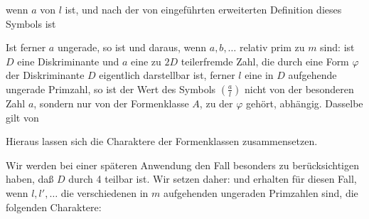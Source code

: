 wenn $a$  von $l$ ist, und nach der von
 eingeführten erweiterten Definition dieses Symbols ist

Ist ferner $a$ ungerade, so ist
und daraus, wenn $a, b, \dots$ relativ prim zu $m$ sind:
ist $D$ eine Diskriminante und $a$ eine zu $2D$ teilerfremde Zahl,
die durch eine Form $\varphi$ der Diskriminante $D$ eigentlich darstellbar
 ist, ferner $l$ eine in $D$ aufgehende ungerade Primzahl,
so ist der Wert des Symbols $\left(\frac{a}{l}\right)$ nicht von der besonderen
Zahl $a$, sondern nur von der Formenklasse $A$, zu der $\varphi$ gehört,
abhängig. Dasselbe gilt von

Hieraus lassen sich die Charaktere der Formenklassen
zusammensetzen.

Wir werden bei einer späteren Anwendung den Fall besonders
 zu berücksichtigen haben, daß $D$ durch 4 teilbar ist.
Wir setzen daher:
und erhalten für diesen Fall, wenn $l, l', \dots$ die verschiedenen
in $m$ aufgehenden ungeraden Primzahlen sind, die folgenden
Charaktere:
